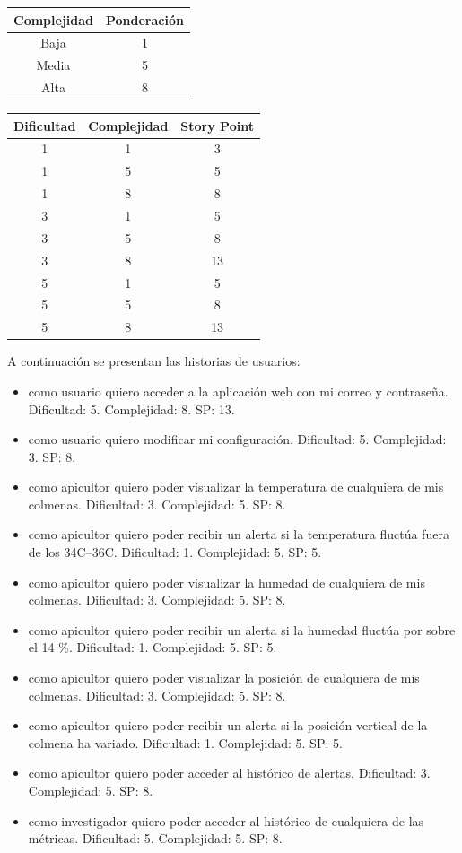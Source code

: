 \documentclass[
11pt, %
codirector, %
]{charter}
\begin{document}
\begin{tabular}{|c|c|}
\hline
\rowcolor[HTML]{C0C0C0} 
Complejidad & Ponderación \\ \hline
Baja      & 1 \\ \hline
Media      & 5 \\ \hline
Alta      & 8 \\ \hline
\end{tabular}

\begin{tabular}{|c|c|c|}
\hline
\rowcolor[HTML]{C0C0C0} 
Dificultad & Complejidad & Story Point \\ \hline
1 & 1 & 3 \\ \hline
1 & 5 & 5 \\ \hline
1 & 8 & 8 \\ \hline
3 & 1 & 5 \\ \hline
3 & 5 & 8 \\ \hline
3 & 8 & 13 \\ \hline
5 & 1 & 5 \\ \hline
5 & 5 & 8 \\ \hline
5 & 8 & 13 \\ \hline
\end{tabular}

A continuación se presentan las historias de usuarios:
\begin{itemize}
	\item como usuario quiero acceder a la aplicación web con mi correo y contraseña. Dificultad: 5. Complejidad: 8. SP: 13.
	\item como usuario quiero modificar mi configuración. Dificultad: 5. Complejidad: 3. SP: 8.
	\item como apicultor quiero poder visualizar la temperatura de cualquiera de mis colmenas. Dificultad: 3. Complejidad: 5. SP: 8.
	\item como apicultor quiero poder recibir un alerta si la temperatura fluctúa fuera de los 34\textdegree{}C--36\textdegree{}C. Dificultad: 1. Complejidad: 5. SP: 5.
	\item como apicultor quiero poder visualizar la humedad de cualquiera de mis colmenas. Dificultad: 3. Complejidad: 5. SP: 8.
	\item como apicultor quiero poder recibir un alerta si la humedad fluctúa por sobre el 14 \%. Dificultad: 1. Complejidad: 5. SP: 5.
	\item como apicultor quiero poder visualizar la posición de cualquiera de mis colmenas. Dificultad: 3. Complejidad: 5. SP: 8.
	\item como apicultor quiero poder recibir un alerta si la posición vertical de la colmena ha variado. Dificultad: 1. Complejidad: 5. SP: 5.
	\item como apicultor quiero poder acceder al histórico de alertas. Dificultad: 3. Complejidad: 5. SP: 8.
	\item como investigador quiero poder acceder al histórico de cualquiera de las métricas. Dificultad: 5. Complejidad: 5. SP: 8.
\end{itemize}
\end{document}
